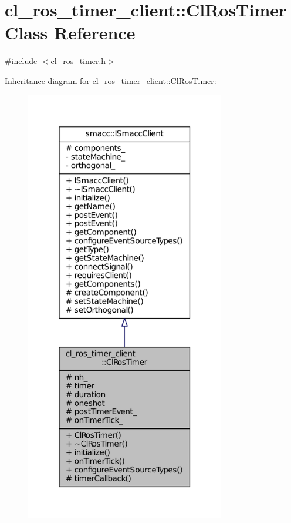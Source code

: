 \hypertarget{classcl__ros__timer__client_1_1ClRosTimer}{}\section{cl\+\_\+ros\+\_\+timer\+\_\+client\+:\+:Cl\+Ros\+Timer Class Reference}
\label{classcl__ros__timer__client_1_1ClRosTimer}


{\ttfamily \#include $<$cl\+\_\+ros\+\_\+timer.\+h$>$}



Inheritance diagram for cl\+\_\+ros\+\_\+timer\+\_\+client\+:\+:Cl\+Ros\+Timer\+:
\nopagebreak
\begin{figure}[H]
\begin{center}
\leavevmode
\includegraphics[width=247pt]{classcl__ros__timer__client_1_1ClRosTimer__inherit__graph}
\end{center}
\end{figure}


